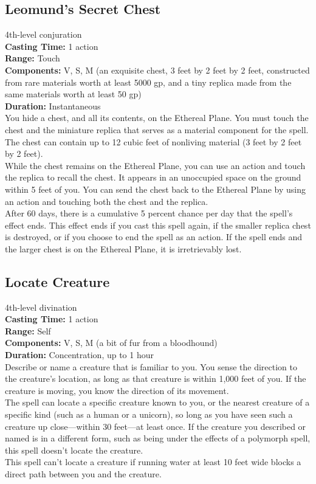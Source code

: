 \documentclass[11pt, A4paper, english]{article}
\begin{document}
		\subsection{Leomund's Secret Chest}
4th-level conjuration \\
\textbf{Casting Time:} 1 action \\
\textbf{Range:} Touch \\
\textbf{Components:} V, S, M (an exquisite chest, 3 feet by 2 feet by 2 feet, constructed from rare materials worth at least 5000 gp, and a tiny replica made from the same materials worth at least 50 gp) \\
\textbf{Duration:} Instantaneous \\
You hide a chest, and all its contents, on the Ethereal Plane. You must touch the chest and the miniature replica that serves as a material component for the spell. The chest can contain up to 12 cubic feet of nonliving material (3 feet by 2 feet by 2 feet). \\
While the chest remains on the Ethereal Plane, you can use an action and touch the replica to recall the chest. It appears in an unoccupied space on the ground within 5 feet of you. You can send the chest back to the Ethereal Plane by using an action and touching both the chest and the replica. \\
After 60 days, there is a cumulative 5 percent chance per day that the spell's effect ends. This effect ends if you cast this spell again, if the smaller replica chest is destroyed, or if you choose to end the spell as an action. If the spell ends and the larger chest is on the Ethereal Plane, it is irretrievably lost.

		\subsection{Locate Creature}
4th-level divination \\
\textbf{Casting Time:} 1 action \\
\textbf{Range:} Self \\
\textbf{Components:} V, S, M (a bit of fur from a bloodhound) \\
\textbf{Duration:} Concentration, up to 1 hour \\
Describe or name a creature that is familiar to you. You sense the direction to the creature’s location, as long as that creature is within 1,000 feet of you. If the creature is moving, you know the direction of its movement. \\
The spell can locate a specific creature known to you, or the nearest creature of a specific kind (such as a human or a unicorn), so long as you have seen such a creature up close—within 30 feet—at least once. If the creature you described or named is in a different form, such as being under the effects of a polymorph spell, this spell doesn’t locate the creature. \\
This spell can’t locate a creature if running water at least 10 feet wide blocks a direct path between you and the creature.
\end{document}
